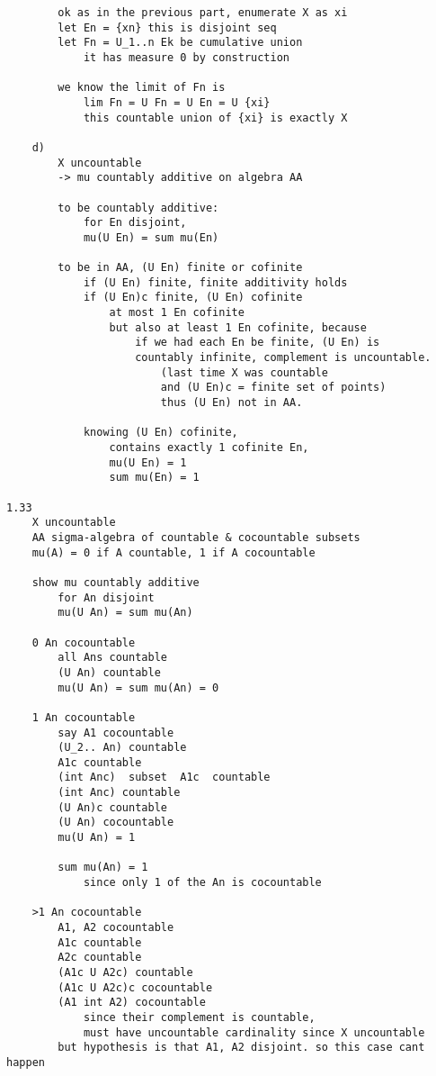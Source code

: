 \documentclass{article}
\begin{document}
\begin{flushleft}
\begin{verbatim}
        ok as in the previous part, enumerate X as xi 
        let En = {xn} this is disjoint seq 
        let Fn = U_1..n Ek be cumulative union 
            it has measure 0 by construction 

        we know the limit of Fn is 
            lim Fn = U Fn = U En = U {xi}
            this countable union of {xi} is exactly X 
    
    d)
        X uncountable 
        -> mu countably additive on algebra AA 

        to be countably additive:
            for En disjoint,
            mu(U En) = sum mu(En) 

        to be in AA, (U En) finite or cofinite 
            if (U En) finite, finite additivity holds 
            if (U En)c finite, (U En) cofinite 
                at most 1 En cofinite 
                but also at least 1 En cofinite, because 
                    if we had each En be finite, (U En) is 
                    countably infinite, complement is uncountable.
                        (last time X was countable 
                        and (U En)c = finite set of points)
                        thus (U En) not in AA.

            knowing (U En) cofinite, 
                contains exactly 1 cofinite En, 
                mu(U En) = 1 
                sum mu(En) = 1 

1.33
    X uncountable 
    AA sigma-algebra of countable & cocountable subsets 
    mu(A) = 0 if A countable, 1 if A cocountable 

    show mu countably additive 
        for An disjoint 
        mu(U An) = sum mu(An)

    0 An cocountable 
        all Ans countable 
        (U An) countable 
        mu(U An) = sum mu(An) = 0

    1 An cocountable 
        say A1 cocountable 
        (U_2.. An) countable 
        A1c countable 
        (int Anc)  subset  A1c  countable 
        (int Anc) countable 
        (U An)c countable 
        (U An) cocountable 
        mu(U An) = 1

        sum mu(An) = 1
            since only 1 of the An is cocountable 

    >1 An cocountable
        A1, A2 cocountable 
        A1c countable 
        A2c countable 
        (A1c U A2c) countable 
        (A1c U A2c)c cocountable 
        (A1 int A2) cocountable
            since their complement is countable, 
            must have uncountable cardinality since X uncountable 
        but hypothesis is that A1, A2 disjoint. so this case cant happen 
        

\end{verbatim}
\end{flushleft}
\end{document}
